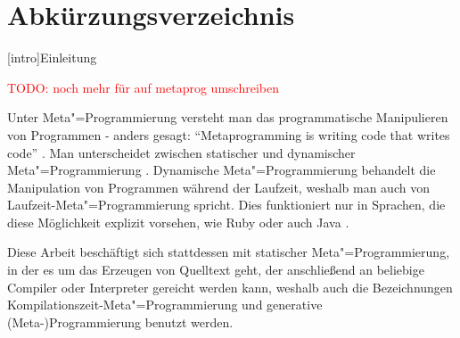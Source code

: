 \documentclass[12pt, a4paper, bibgerm]{scrbook}
\newcommand{\todo}[1]{
  \textcolor{red}{TODO: #1}
}
\newcommand\lchapter{}
\newcommand{\mprog}{Meta"=Programmierung}
\begin{document}
\cleardoublepage


\tableofcontents

\chapter*{Abkürzungsverzeichnis}
\begin{acronym}
\end{acronym}



\lchapter[intro]{Einleitung}


\todo{noch mehr für auf metaprog umschreiben}

Unter \mprog{} versteht man das programmatische Manipulieren von
Programmen - anders gesagt: ``Metaprogramming is writing code that
writes code'' \cite[S.16]{metaprog-ruby}. Man unterscheidet zwischen
statischer und dynamischer
\mprog{} \cite[S.17]{metaprog-ruby}. Dynamische \mprog{} behandelt die
Manipulation von Programmen während der Laufzeit, weshalb man auch von
Laufzeit-\mprog{} spricht. Dies funktioniert nur in Sprachen, die diese
Möglichkeit explizit vorsehen, wie Ruby \cite{metaprog-ruby} oder auch
Java \cite{JavaReflection}.

Diese Arbeit beschäftigt sich stattdessen mit statischer
\mprog{}, in der es um das Erzeugen von Quelltext geht, der anschließend
an beliebige Compiler oder Interpreter gereicht werden kann, weshalb 
auch die Bezeichnungen Kompilationszeit-\mprog{} und generative
(Meta-)Programmierung \cite[S.17]{metaprog-sh} benutzt werden.
\end{document}
